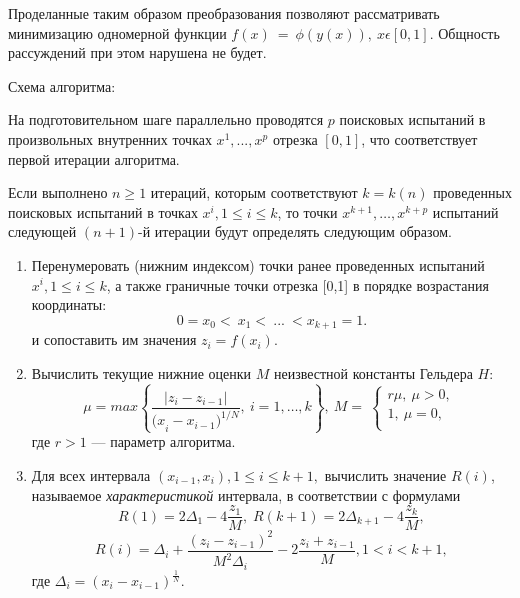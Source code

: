 \documentclass[12pt, a4paper, russian]{article}
\begin{document}
Проделанные таким образом преобразования позволяют рассматривать минимизацию одномерной функции $f(x)\ =\ \phi(y(x)), \ x\epsilon [0,1]$. Общность рассуждений при этом нарушена не будет. 

Схема алгоритма:

На подготовительном шаге параллельно проводятся $p$ поисковых испытаний в произвольных внутренних точках $x^1, ...,x^p$ отрезка $[0,1]$, что соответствует первой итерации  алгоритма. 

Если выполнено $n\geq1$ итераций, которым соответствуют $k=k(n)$ проведенных поисковых испытаний в точках $x^i, 1\leq i\leq k$, то точки $x^{k+1},\ldots,x^{k+p}$ испытаний следующей $(n+1)$-й итерации будут определять следующим образом.

\begin{enumerate}

	\item  Перенумеровать (нижним индексом) точки ранее проведенных испытаний $x^i, 1\leq i\leq k$, а также граничные точки отрезка [0,1] в порядке возрастания координаты:
 \begin{equation}
		\label{agp1_sort}
	0=x_0<\ x_1<\ ...\ <x_{k+1}=1.
	\end{equation}
	и сопоставить им значения $z_i=f(x_i)$. 
	
	\item  Вычислить текущие нижние оценки $M$ неизвестной константы Гельдера $H$:
 \begin{equation}
		\label{agp2_mu}
	\mu=max\left\{\frac{|z_i-z_{i-1}|}{{{(x}_i-x_{i-1})}^{1/N}},\ i=1,\ldots,k\right\},\ M=\ \left\{\begin{matrix}r\mu,\ \mu>0,\\1,\ \mu=0,\\\end{matrix}\right.\
	\end{equation}
	где $r>1$ --- параметр алгоритма.
   
	\item  Для всех интервала $(x_{i-1},x_i), 1\leq i\leq k+1,$ вычислить значение $R(i)$, называемое \textit{характеристикой} интервала, в соответствии с формулами
	\begin{equation}
		\label{agp3_R1}
		R(1)=2\Delta_1-4\dfrac{z_1}{M}, \; R(k+1)=2\Delta_{k+1}-4\dfrac{z_k}{M},
	\end{equation}
	\begin{equation}
		\label{agp3_Ri}
		R(i)=\Delta_i+\dfrac{(z_i-z_{i-1})^2}{M^2\Delta_i}-2\dfrac{z_i+z_{i-1}}{M},1<i<k+1,
	\end{equation}
	где \(\Delta_i=(x_i-x_{i-1})^\frac{1}{N}\).
   

\end{enumerate}
\end{document}
